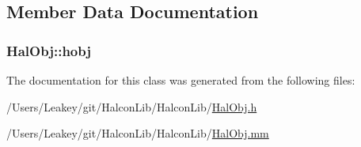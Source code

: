 \subsection{Member Data Documentation}
\subsubsection[{\texorpdfstring{hobj}{hobj}}]{ Hal\+Obj\+::hobj}\hypertarget{class_hal_obj_a20f13e7070ba804543cb6ecddf5e7346}{}\label{class_hal_obj_a20f13e7070ba804543cb6ecddf5e7346}


The documentation for this class was generated from the following files\+:\begin{DoxyCompactItemize}
\item 
/\+Users/\+Leakey/git/\+Halcon\+Lib/\+Halcon\+Lib/\hyperlink{_hal_obj_8h}{Hal\+Obj.\+h}\item 
/\+Users/\+Leakey/git/\+Halcon\+Lib/\+Halcon\+Lib/\hyperlink{_hal_obj_8mm}{Hal\+Obj.\+mm}\end{DoxyCompactItemize}

